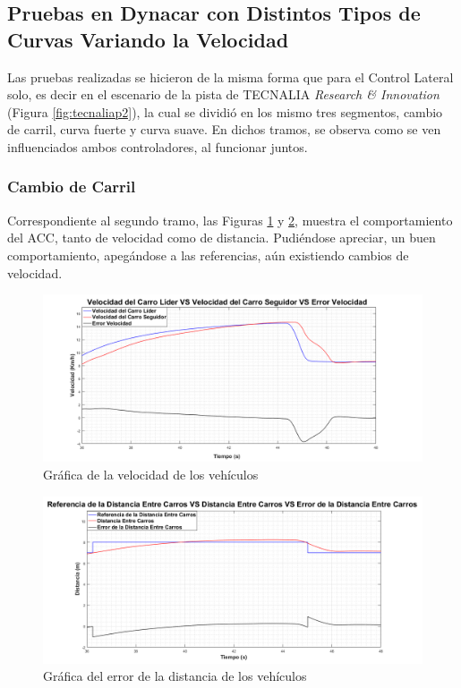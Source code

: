 \subsection{Pruebas en Dynacar con Distintos Tipos de Curvas Variando la Velocidad}

Las pruebas realizadas se hicieron de la misma forma que para el Control Lateral solo, es decir en el escenario de la pista de TECNALIA \textit{Research \& Innovation} (Figura \ref{fig:tecnaliap2}), la cual se dividió en los mismo tres segmentos, cambio de carril, curva fuerte y curva suave. En dichos tramos, se observa como se ven influenciados ambos controladores, al funcionar juntos. 

\subsubsection{Cambio de Carril}

Correspondiente al segundo tramo, las Figuras \ref{fig:vacc} y \ref{fig:distcc}, muestra el comportamiento del ACC, tanto de velocidad como de distancia. Pudiéndose apreciar, un buen comportamiento, apegándose a las referencias, aún existiendo cambios de velocidad.\\

\begin{figure}[!h]
	\centering
		\includegraphics[scale=0.35]{Imagenes/vacc}
		\caption{Gráfica de la velocidad de los vehículos}
		\label{fig:vacc}
\end{figure}	 

\begin{figure}[!h]
	\centering
		\includegraphics[scale=0.35]{Imagenes/dacs}
		\caption{Gráfica del error de la distancia de los vehículos}
		\label{fig:distcc}
\end{figure}	 

